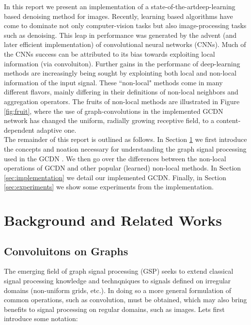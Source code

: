 \documentclass[12pt,a4paper,reqno]{amsart}
\newcommand{\soa}{state-of-the-art}
\begin{document}
In this report we present an implementation of a \soa deep-learning based
denoising method \cite{ValsesiaICIP19} for images. Recently, learning based
algorithms have come to dominate not only computer-vision tasks but also
image-processing tasks such as denoising. This leap in performance was generated
by the advent (and later efficient implementation) of convolutional neural
networks (CNNs). Much of the CNNs success can be attributed to its bias towards
exploiting local information (via convoluiton). Further gains in the performanc
of deep-learning methods are increasingly being sought by explointing both local
and non-local information of the input signal. These ``non-local" methods come
in many different flavors, mainly differing in their definitions of non-local
neighbors and aggregation operators. The fruits of non-local methods are
illustrated in Figure \ref{fig:fruit}, where the use of graph-convolutions in the
implemented GCDN network has changed the uniform, radially growing receptive
field, to a content-dependent adaptive one. \\

The remainder of this report is outlined as follows. In Section
\ref{sec:background} we first introduce the concepts and noation necessary for
understanding the graph signal processing used in the GCDN
\cite{ValsesiaICIP19}. We then go over the differences between the non-local
operations of GCDN and other popular (learned) non-local methods. In Section
\ref{sec:implementation} we detail our implemented GCDN. Finally, in Section
\ref{sec:experiments} we show some experiments from the implementation.


\section{Background and Related Works} \label{sec:background}
\subsection{Convoluitons on Graphs}
The emerging field of graph signal processing (GSP) seeks to extend classical
signal processing knowledge and technqniques to signals defined on irregular
domains (non-uniform grids, etc.). In doing so a more general formulation of
common operations, such as convolution, must be obtained, which may also bring
benefits to signal processing on regular domains, such as images. Lets first
introduce some notation: \\
\end{document}
